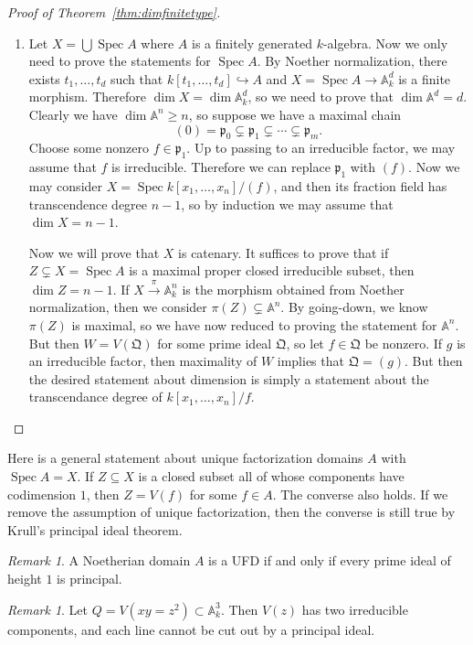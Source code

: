 \documentclass[leqno, openany]{memoir}
\theoremstyle{definition}
\theoremstyle{remark}
\newtheorem{rmk}[thm]{Remark}
\theoremstyle{plain}
\theoremstyle{definition}
\theoremstyle{remark}
\newcommand{\A}{\mathbb{A}}
\newcommand{\mf}[1]{\mathfrak{#1}}
\DeclareMathOperator{\Spec}{Spec}
\begin{document}
\begin{proof}[Proof of Theorem~\ref{thm:dimfinitetype}]\leavevmode
    \begin{enumerate}
        \item Let $X = \bigcup \Spec A$ where $A$ is a finitely generated $k$-algebra. Now we only need to prove the statements for $\Spec A$. By Noether normalization, there exists $t_1, \ldots, t_d$ such that $k[t_1, \ldots, t_d] \hookrightarrow A$ and $X = \Spec A \to \A_k^d$ is a finite morphism. Therefore $\dim X = \dim \A^d_k$, so we need to prove that $\dim \A^d = d$. Clearly we have $\dim \A^n \geq n$, so suppose we have a maximal chain
            \[ (0) = \mf{p}_0 \subsetneq \mf{p}_1 \subsetneq \cdots \subsetneq \mf{p}_m. \]
            Choose some nonzero $f \in \mf{p}_1$. Up to passing to an irreducible factor, we may assume that $f$ is irreducible. Therefore we can replace $\mf{p}_1$ with $(f)$. Now we may consider $X = \Spec k[x_1, \ldots, x_n]/(f)$, and then its fraction field has transcendence degree $n-1$, so by induction we may assume that $\dim X = n-1$.

            Now we will prove that $X$ is catenary. It suffices to prove that if $Z \subsetneq X = \Spec A$ is a maximal proper closed irreducible subset, then $\dim Z = n-1$. If $X \xrightarrow{\pi} \A^n_k$ is the morphism obtained from Noether normalization, then we consider $\pi(Z) \subsetneq \A^n$. By going-down, we know $\pi(Z)$ is maximal, so we have now reduced to proving the statement for $\A^n$. But then $W = V(\mf{Q})$ for some prime ideal $\mf{Q}$, so let $f \in \mf{Q}$ be nonzero. If $g$ is an irreducible factor, then maximality of $W$ implies that $\mf{Q} = (g)$. But then the desired statement about dimension is simply a statement about the transcendance degree of $k[x_1, \ldots, x_n]/f$.
    \end{enumerate}
\end{proof}

Here is a general statement about unique factorization domains $A$ with $\Spec A = X$. If $Z \subseteq X$ is a closed subset all of whose components have codimension $1$, then $Z = V(f)$ for some $f \in A$. The converse also holds. If we remove the assumption of unique factorization, then the converse is still true by Krull's principal ideal theorem. 

\begin{rmk}
    A Noetherian domain $A$ is a UFD if and only if every prime ideal of height $1$ is principal.
\end{rmk}

\begin{rmk}
    Let $Q = V(xy = z^2) \subset \A^3_k$. Then $V(z)$ has two irreducible components, and each line cannot be cut out by a principal ideal.
\end{rmk}
\end{document}
